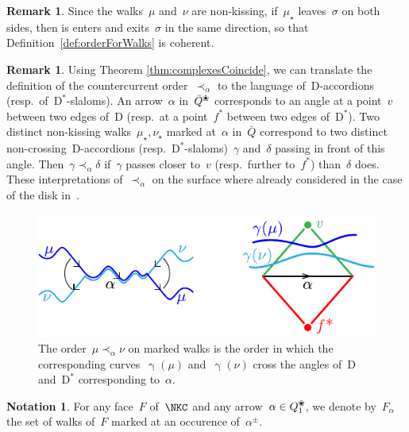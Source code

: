 \documentclass{amsart}
\theoremstyle{definition}
\newtheorem{remark}[theorem]{Remark}
\newtheorem{notation}[theorem]{Notation}
\newcommand{\blossom}{^\text{\ding{96}}} %
\newcommand{\dual}{^*} %
\newcommand{\dissection}{\mathrm{D}} %
\newcommand{\curveof}{\operatorname{\gamma}} %
\begin{document}
\begin{remark}
Since the walks~$\mu$ and~$\nu$ are non-kissing, if~$\mu_\star$ leaves~$\sigma$ on both sides, then is enters and exits~$\sigma$ in the same direction, so that Definition~\ref{def:orderForWalks} is coherent.
\end{remark}


\begin{remark}
\label{rem:countercurrentOrderOnSurface}
Using Theorem \ref{thm:complexesCoincide}, we can translate the definition of the countercurrent order~$\prec_\alpha$ to the language of~$\dissection$-accordions (resp.~of~$\dissection\dual$-slaloms).
An arrow~$\alpha$ in~$\bar Q\blossom$ corresponds to an angle at a point~$v$ between two edges of~$\dissection$ (resp.~at a point~$f\dual$ between two edges of~$\dissection\dual$).
Two distinct non-kissing walks~$\mu_\star, \nu_\star$ marked at~$\alpha$ in~$\bar Q$ correspond to two distinct non-crossing~$\dissection$-accordions (resp.~$\dissection\dual$-slaloms)~$\gamma$ and~$\delta$ passing in front of this angle.
Then~$\gamma \prec_\alpha \delta$ if~$\gamma$ passes closer to~$v$ (resp.~further to~$f\dual$) than~$\delta$ does.
These interpretations of~$\prec_\alpha$ on the surface where already considered in the case of the disk in~\cite{GarverMcConville, MannevillePilaud-accordion}.
%
\begin{figure}[h]
	\capstart
	\centerline{\includegraphics[scale=1]{orderCurves}}
	\caption{The order~$\mu \prec_\alpha \nu$ on marked walks is the order in which the corresponding curves~$\curveof(\mu)$ and~$\curveof(\nu)$ cross the angles of~$\dissection$ and~$\dissection\dual$ corresponding to~$\alpha$.}
	\label{fig:orderCurves}
\end{figure}
\end{remark}

\begin{notation}
\label{notation:Falpha}
For any face~$F$ of~$\NKC$ and any arrow~$\alpha\in Q_1\blossom$, we denote by~$F_\alpha$ the set of walks of~$F$ marked at an occurence of~$\alpha^\pm$.
\end{notation}
\end{document}
